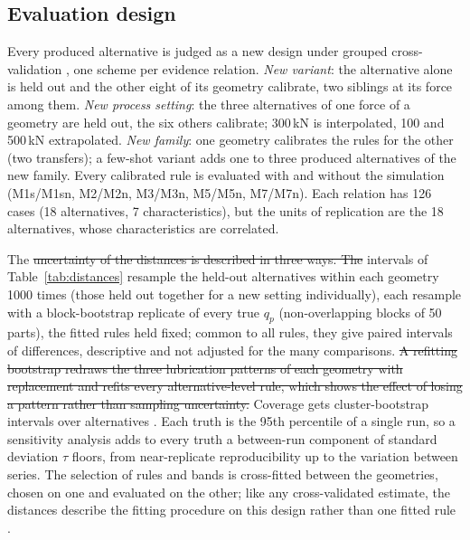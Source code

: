 \documentclass[pdflatex,sn-basic,lineno]{sn-jnl}
\providecommand{\DIFadd}[1]{{\protect\color{blue}\uwave{#1}}} %
\providecommand{\DIFdel}[1]{{\protect\color{red}\sout{#1}}}                      %
\providecommand{\DIFaddbegin}{} %
\providecommand{\DIFaddend}{} %
\providecommand{\DIFdelbegin}{} %
\providecommand{\DIFdelend}{} %
\newcommand{\DIFscaledelfig}{0.5}
\newlength{\DIFdelgraphicswidth} %
\newlength{\DIFdelgraphicsheight} %
\newcommand{\DIFaddincludegraphics}[2][]{{\color{blue}\fbox{\DIFOincludegraphics[#1]{#2}}}} %
\newcommand{\DIFdelincludegraphics}[2][]{%
\sbox{\DIFdelgraphicsbox}{\DIFOincludegraphics[#1]{#2}}%
\settoboxwidth{\DIFdelgraphicswidth}{\DIFdelgraphicsbox} %
\settoboxtotalheight{\DIFdelgraphicsheight}{\DIFdelgraphicsbox} %
\scalebox{\DIFscaledelfig}{%
\parbox[b]{\DIFdelgraphicswidth}{\usebox{\DIFdelgraphicsbox}\\[-\baselineskip] \rule{\DIFdelgraphicswidth}{0em}}\llap{\resizebox{\DIFdelgraphicswidth}{\DIFdelgraphicsheight}{%
\setlength{\unitlength}{\DIFdelgraphicswidth}%
\begin{picture}(1,1)%
\thicklines\linethickness{2pt} %
{\color[rgb]{1,0,0}\put(0,0){\framebox(1,1){}}}%
{\color[rgb]{1,0,0}\put(0,0){\line( 1,1){1}}}%
{\color[rgb]{1,0,0}\put(0,1){\line(1,-1){1}}}%
\end{picture}%
}\hspace*{3pt}}} %
} %
\DeclareRobustCommand{\DIFaddbegin}{\DIFOaddbegin \let\includegraphics\DIFaddincludegraphics} %
\DeclareRobustCommand{\DIFaddend}{\DIFOaddend \let\includegraphics\DIFOincludegraphics} %
\DeclareRobustCommand{\DIFdelbegin}{\DIFOdelbegin \let\includegraphics\DIFdelincludegraphics} %
\DeclareRobustCommand{\DIFdelend}{\DIFOaddend \let\includegraphics\DIFOincludegraphics} %
\begin{document}
\subsection{Evaluation design}\label{sec:evaldesign}

Every produced alternative is judged as a new design under grouped cross-validation \citep{roberts2017cross}, one scheme per evidence relation. \emph{New variant}: the alternative alone is held out and the other eight of its geometry calibrate, two siblings at its force among them. \emph{New process setting}: the three alternatives of one force of a geometry are held out, the six others calibrate; 300\,kN is interpolated, 100 and 500\,kN extrapolated. \emph{New family}: one geometry calibrates the rules for the other (two transfers); a few-shot variant adds one to three produced alternatives of the new family. Every calibrated rule is evaluated with and without the simulation (M1s/M1sn, M2/M2n, M3/M3n, M5/M5n, M7/M7n). Each relation has 126 cases (18 alternatives, 7 characteristics), but the units of replication are the 18 alternatives, whose characteristics are correlated.

The \DIFdelbegin \DIFdel{uncertainty of the distances is described in three ways. The }\DIFdelend intervals of Table~\ref{tab:distances} resample the held-out alternatives within each geometry 1000 times (those held out together for a new setting individually), each resample with a block-bootstrap replicate of every true $q_p$ (non-overlapping blocks of 50 parts), the fitted rules held fixed; common to all rules, they give paired intervals of differences, descriptive and not adjusted for the many comparisons. \DIFdelbegin \DIFdel{A refitting bootstrap redraws the three lubrication patterns of each geometry with replacement and refits every alternative-level rule, which shows the effect of losing a pattern rather than sampling uncertainty. }\DIFdelend Coverage gets cluster-bootstrap intervals over alternatives \DIFaddbegin \DIFadd{where each has its own calibration set}\DIFaddend . Each truth is the 95th percentile of a single run, so a sensitivity analysis adds to every truth a between-run component of standard deviation $\tau$ floors, from near-replicate reproducibility up to the variation between series. The selection of rules and bands is cross-fitted between the geometries, chosen on one and evaluated on the other; like any cross-validated estimate, the distances describe the fitting procedure on this design rather than one fitted rule \citep{bates2024cross}.
\end{document}
